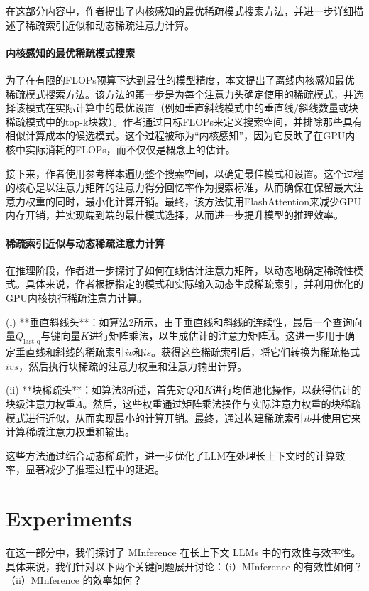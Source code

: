 \documentclass[twocolumn, 10pt]{article} %
\theoremstyle{remark}
\begin{document}
在这部分内容中，作者提出了内核感知的最优稀疏模式搜索方法，并进一步详细描述了稀疏索引近似和动态稀疏注意力计算。

\paragraph{内核感知的最优稀疏模式搜索}
为了在有限的FLOPs预算下达到最佳的模型精度，本文提出了离线内核感知最优稀疏模式搜索方法。该方法的第一步是为每个注意力头确定使用的稀疏模式，并选择该模式在实际计算中的最优设置（例如垂直斜线模式中的垂直线/斜线数量或块稀疏模式中的top-k块数）。作者通过目标FLOPs来定义搜索空间，并排除那些具有相似计算成本的候选模式。这个过程被称为“内核感知”，因为它反映了在GPU内核中实际消耗的FLOPs，而不仅仅是概念上的估计。

接下来，作者使用参考样本遍历整个搜索空间，以确定最佳模式和设置。这个过程的核心是以注意力矩阵的注意力得分回忆率作为搜索标准，从而确保在保留最大注意力权重的同时，最小化计算开销。最终，该方法使用FlashAttention来减少GPU内存开销，并实现端到端的最佳模式选择，从而进一步提升模型的推理效率。

\paragraph{稀疏索引近似与动态稀疏注意力计算}
在推理阶段，作者进一步探讨了如何在线估计注意力矩阵，以动态地确定稀疏性模式。具体来说，作者根据指定的模式和实际输入动态生成稀疏索引，并利用优化的GPU内核执行稀疏注意力计算。

(i) **垂直斜线头**：如算法2所示，由于垂直线和斜线的连续性，最后一个查询向量$Q_{\text{last\_q}}$与键向量$K$进行矩阵乘法，以生成估计的注意力矩阵$\hat{A}$。这进一步用于确定垂直线和斜线的稀疏索引$iv$和$is$。获得这些稀疏索引后，将它们转换为稀疏格式$ivs$，然后执行块稀疏的注意力权重和注意力输出计算。

(ii) **块稀疏头**：如算法3所述，首先对$Q$和$K$进行均值池化操作，以获得估计的块级注意力权重$\hat{A}$。然后，这些权重通过矩阵乘法操作与实际注意力权重的块稀疏模式进行近似，从而实现最小的计算开销。最终，通过构建稀疏索引$ib$并使用它来计算稀疏注意力权重和输出。

这些方法通过结合动态稀疏性，进一步优化了LLM在处理长上下文时的计算效率，显著减少了推理过程中的延迟。



\section{Experiments}

在这一部分中，我们探讨了 MInference 在长上下文 LLMs 中的有效性与效率性。具体来说，我们针对以下两个关键问题展开讨论：（i）MInference 的有效性如何？（ii）MInference 的效率如何？
\end{document}
